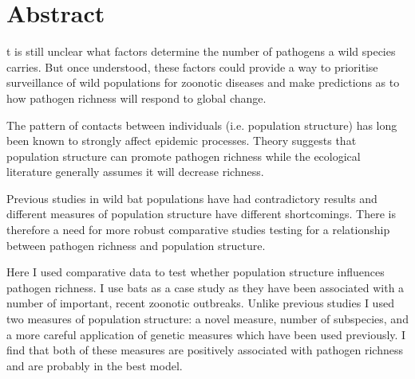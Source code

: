 





\section{Abstract}


t is still unclear what factors determine the number of pathogens a wild species carries.
But once understood, these factors could provide a way to prioritise surveillance of wild populations for zoonotic diseases and make predictions as to how pathogen richness will respond to global change.




The pattern of contacts between individuals (i.e. population structure) has long been known to strongly affect epidemic processes.
Theory suggests that population structure can promote pathogen richness while the ecological literature generally assumes it will decrease richness.



Previous studies in wild bat populations have had contradictory results and different measures of population structure have different shortcomings.
There is therefore a need for more robust comparative studies testing for a relationship between pathogen richness and population structure.


Here I used comparative data to test whether population structure influences pathogen richness.
I use bats as a case study as they have been associated with a number of important, recent zoonotic outbreaks.
Unlike previous studies I used two measures of population structure: a novel measure, number of subspecies, and a more careful application of genetic measures which have been used previously.
I find that both of these measures are positively associated with pathogen richness and are probably in the best model.



